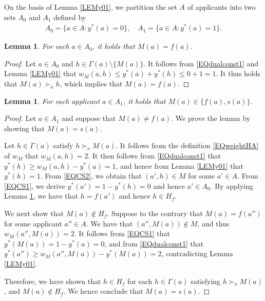 \documentclass[11pt,a4paper,showkeys]{article}
\theoremstyle{plain}
\newtheorem{lemma}[theorem]{Lemma}
\theoremstyle{definition}
\begin{document}
On the basis of Lemma \ref{LEMy01}, 
we partition the set $A$ of applicants into two sets $A_0$ and $A_1$ defined by 
\begin{align*}
    A_0 = \{a\in A \colon y^*(a) =0\}, \quad A_1 = \{a\in A \colon y^*(a) =1\}.
\end{align*}



\begin{lemma}
    \label{LEMA0HA}
    For each $a\in A_0$, 
    it holds that $M(a)=f(a)$. 
\end{lemma}

\begin{proof}
    Let $a\in A_0$ and $h \in \Gamma(a) \setminus \{M(a)\}$. 
    It follows from \eqref{EQdualconst1} and Lemma \ref{LEMy01} that 
    $w_M(a,h)\le y^*(a) + y^*(h) \le 0+1=1$. 
    It thus holds that $M(a)\succ_a h$, 
    which implies that $M(a)=f(a)$. 
\end{proof}

\begin{lemma}
    \label{LEMA1HA}
    For each applicant $a\in A_1$, 
    it holds that $M(a) \in \{f(a),s(a)\}$. 
\end{lemma}

\begin{proof}
    Let $a\in A_1$ and 
    suppose that $M(a)\neq f(a)$. 
    We prove the lemma by showing that $M(a) = s(a)$. 

    Let $h\in \Gamma(a)$ satisfy $h\succ_a M(a)$. 
    It follows from the definition \eqref{EQweightHA} of $w_M$ that $w_M(a,h) = 2$. 
    It then follows from \eqref{EQdualconst1} that 
    $y^*(h) \ge w_M(a,h) - y^*(a) =1$, 
    and hence from Lemma \ref{LEMy01} that $y^*(h)  =1$. 
    From \eqref{EQCS2}, 
    we obtain that $(a',h)\in M$ for some $a'\in A$. 
    From \eqref{EQCS1}, 
    we derive $y^*(a') = 1 - y^*(h) = 0$ and hence $a'\in A_0$. 
    By applying Lemma \ref{LEMA0HA}, 
    we have that $h=f(a')$ and hence $h\in H_f$. 

    We next show that $M(a) \not\in H_f$. 
    Suppose to the contrary that $M(a) = f(a'')$ for some applicant $a''\in A$. 
    We have that $(a'',M(a))\not\in M$, 
    and thus $w_M(a'',M(a))=2$. 
    It follows from \eqref{EQCS1} that $y^*(M(a))=1-y^*(a)=0$, 
    and from \eqref{EQdualconst1} that $y^*(a'')\ge w_M(a'',M(a)) - y^*(M(a))=2$, contradicting Lemma \ref{LEMy01}. 

    Therefore, 
    we have shown that $h\in H_f$ for each $h\in \Gamma(a)$ satisfying $h\succ_a M(a)$, and 
    $M(a)\not \in H_f$. 
    We hence conclude that $M(a)=s(a)$. 
\end{proof}
\end{document}

